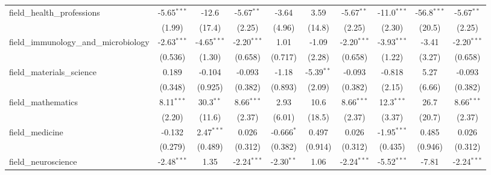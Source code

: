 \begin{tabular}{lccccccccc}
   field\_health\_professions                                  & -5.65$^{***}$ & -12.6         & -5.67$^{**}$  & -3.64          & 3.59         & -5.67$^{**}$  & -11.0$^{***}$ & -56.8$^{***}$  & -5.67$^{**}$\\   
                                                               & (1.99)        & (17.4)        & (2.25)        & (4.96)         & (14.8)       & (2.25)        & (2.30)        & (20.5)         & (2.25)\\   
   field\_immunology\_and\_microbiology                        & -2.63$^{***}$ & -4.65$^{***}$ & -2.20$^{***}$ & 1.01           & -1.09        & -2.20$^{***}$ & -3.93$^{***}$ & -3.41          & -2.20$^{***}$\\   
                                                               & (0.536)       & (1.30)        & (0.658)       & (0.717)        & (2.28)       & (0.658)       & (1.22)        & (3.27)         & (0.658)\\   
   field\_materials\_science                                   & 0.189         & -0.104        & -0.093        & -1.18          & -5.39$^{**}$ & -0.093        & -0.818        & 5.27           & -0.093\\   
                                                               & (0.348)       & (0.925)       & (0.382)       & (0.893)        & (2.09)       & (0.382)       & (2.15)        & (6.66)         & (0.382)\\   
   field\_mathematics                                          & 8.11$^{***}$  & 30.3$^{**}$   & 8.66$^{***}$  & 2.93           & 10.6         & 8.66$^{***}$  & 12.3$^{***}$  & 26.7           & 8.66$^{***}$\\   
                                                               & (2.20)        & (11.6)        & (2.37)        & (6.01)         & (18.5)       & (2.37)        & (3.37)        & (20.7)         & (2.37)\\   
   field\_medicine                                             & -0.132        & 2.47$^{***}$  & 0.026         & -0.666$^{*}$   & 0.497        & 0.026         & -1.95$^{***}$ & 0.485          & 0.026\\   
                                                               & (0.279)       & (0.489)       & (0.312)       & (0.382)        & (0.914)      & (0.312)       & (0.435)       & (0.946)        & (0.312)\\   
   field\_neuroscience                                         & -2.48$^{***}$ & 1.35          & -2.24$^{***}$ & -2.30$^{**}$   & 1.06         & -2.24$^{***}$ & -5.52$^{***}$ & -7.81          & -2.24$^{***}$\\   

\end{tabular}
